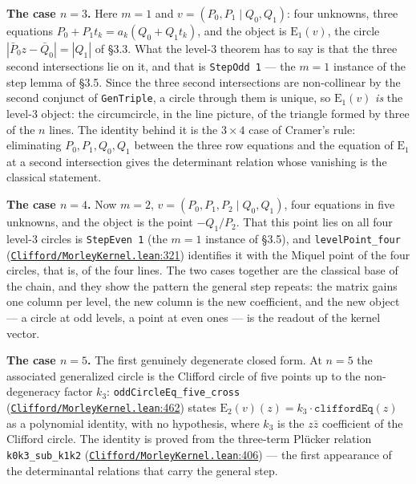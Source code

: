 \documentclass[11pt]{article}
\theoremstyle{definition}
\theoremstyle{remark}
\begin{document}
\textbf{The case \(n = 3\).} Here \(m = 1\) and \(v = (P_0, P_1 \mid Q_0, Q_1)\): four unknowns, three equations
\(P_0 + P_1 t_k = a_k (Q_0 + Q_1 t_k)\), and the object is \(\mathrm{E}_1(v)\), the circle
\(|\bar P_0 z - \bar Q_0| = |Q_1|\) of \S{}3.3. What the level-3 theorem has to say is that the three second
intersections lie on it, and that is \texttt{StepOdd\ 1} --- the \(m = 1\) instance of the step lemma of \S{}3.5. Since
the three second intersections are non-collinear by the second conjunct of \texttt{GenTriple}, a circle through
them is unique, so \(\mathrm{E}_1(v)\) \emph{is} the level-3 object: the circumcircle, in the line picture, of
the triangle formed by three of the \(n\) lines. The identity behind it is the \(3 \times 4\) case of
Cramer's rule: eliminating \(P_0, P_1, Q_0, Q_1\) between the three row equations and the equation of
\(\mathrm{E}_1\) at a second intersection gives the determinant relation whose vanishing is the classical
statement.

\textbf{The case \(n = 4\).} Now \(m = 2\), \(v = (P_0, P_1, P_2 \mid Q_0, Q_1)\), four equations in five
unknowns, and the object is the point \(-Q_1/P_2\). That this point lies on all four level-3 circles is
\texttt{StepEven\ 1} (the \(m = 1\) instance of \S{}3.5), and \texttt{levelPoint\_\allowbreak four} (\href{https://github.com/jpbald93/paperl_clifford_chain/blob/e1ae145c2565cc98816635387412edc0a740c27c/Clifford/MorleyKernel.lean\#L321}{\texttt{Clifford/\allowbreak MorleyKernel.lean}:321})
identifies it with the Miquel point of the four circles, that is, of the four lines. The two cases
together are the classical base of the chain, and they show the pattern the general step repeats: the
matrix gains one column per level, the new column is the new coefficient, and the new object --- a circle
at odd levels, a point at even ones --- is the readout of the kernel vector.

\textbf{The case \(n = 5\).} The first genuinely degenerate closed form. At \(n = 5\) the associated generalized
circle is the Clifford circle of five points up to the non-degeneracy factor \(k_3\):
\texttt{oddCircleEq\_\allowbreak five\_\allowbreak cross} (\href{https://github.com/jpbald93/paperl_clifford_chain/blob/e1ae145c2565cc98816635387412edc0a740c27c/Clifford/MorleyKernel.lean\#L462}{\texttt{Clifford/\allowbreak MorleyKernel.lean}:462}) states
\(\mathrm{E}_2(v)(z) = k_3 \cdot \texttt{cliffordEq}(z)\) as a polynomial identity, with no hypothesis, where
\(k_3\) is the \(z\bar z\) coefficient of the Clifford circle. The identity is proved from the three-term
Plücker relation \texttt{k0k3\_\allowbreak sub\_\allowbreak k1k2} (\href{https://github.com/jpbald93/paperl_clifford_chain/blob/e1ae145c2565cc98816635387412edc0a740c27c/Clifford/MorleyKernel.lean\#L406}{\texttt{Clifford/\allowbreak MorleyKernel.lean}:406}) --- the first appearance of the
determinantal relations that carry the general step.
\end{document}

